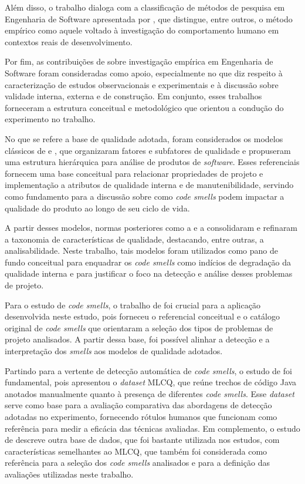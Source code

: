 Além disso, o trabalho dialoga com a classificação de métodos de pesquisa em Engenharia de Software apresentada por 
, que distingue, entre outros, o método empírico como aquele voltado à investigação do comportamento humano 
em contextos reais de desenvolvimento.  

Por fim, as contribuições de  sobre investigação empírica em Engenharia de Software foram consideradas 
como apoio, especialmente no que diz respeito à caracterização de estudos observacionais e experimentais e à 
discussão sobre validade interna, externa e de construção. Em conjunto, esses trabalhos forneceram a estrutura conceitual e 
metodológico que orientou a condução do experimento no trabalho.

No que se refere a base de qualidade adotada, foram considerados os modelos clássicos de  e 
, que organizaram fatores e subfatores de qualidade e propuseram uma estrutura hierárquica para análise 
de produtos de \textit{software}. Esses referenciais fornecem uma base conceitual para relacionar propriedades de projeto e 
implementação a atributos de qualidade interna e de manutenibilidade, servindo como fundamento para a discussão sobre 
como \textit{code smells} podem impactar a qualidade do produto ao longo de seu ciclo de vida.

A partir desses modelos, normas posteriores como a  e a  consolidaram e refinaram a taxonomia de 
características de qualidade, destacando, entre outras, a analisabilidade. Neste trabalho, tais modelos 
foram utilizados como pano de fundo conceitual para enquadrar os \textit{code smells} como indícios de degradação da qualidade interna 
e para justificar o foco na detecção e análise desses problemas de projeto.

Para o estudo de \textit{code smells}, o trabalho de  foi crucial para a aplicação desenvolvida neste estudo, 
pois forneceu o referencial conceitual e o catálogo original de \textit{code smells} que orientaram a seleção dos 
tipos de problemas de projeto analisados. A partir dessa base, foi possível alinhar a detecção e a interpretação 
dos \textit{smells} aos modelos de qualidade adotados.

Partindo para a vertente de detecção automática de \textit{code smells}, o estudo de  foi 
fundamental, pois apresentou o \textit{dataset} MLCQ, que reúne trechos de código Java anotados manualmente quanto à presença 
de diferentes \textit{code smells}. Esse \textit{dataset} serve como base para a avaliação comparativa das abordagens de detecção 
adotadas no experimento, fornecendo rótulos humanos que funcionam como referência  para medir a eficácia 
das técnicas avaliadas. Em complemento, o estudo de  descreve outra base de dados, que foi bastante utilizada nos estudos, com características 
semelhantes ao MLCQ, que também foi considerada como referência para a seleção dos \textit{code smells} analisados e para a 
definição das avaliações utilizadas neste trabalho.


